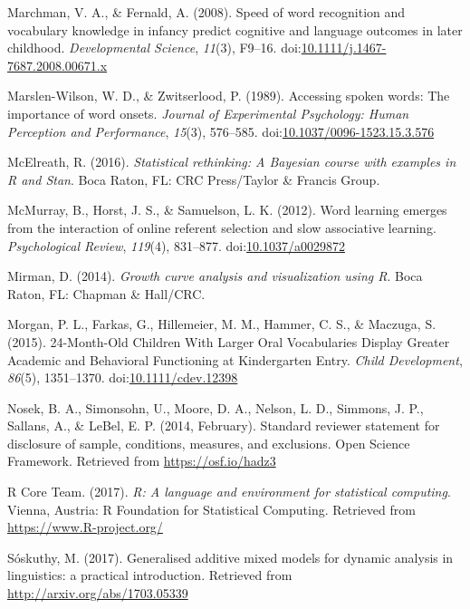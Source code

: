 \documentclass [11pt, proquest] {uwthesis}[2015/03/03]
\begin{document}
\hypertarget{ref-MarchmanFernald2008}{}
Marchman, V. A., \& Fernald, A. (2008). Speed of word recognition and
vocabulary knowledge in infancy predict cognitive and language outcomes
in later childhood. \emph{Developmental Science}, \emph{11}(3), F9--16.
doi:\href{https://doi.org/10.1111/j.1467-7687.2008.00671.x}{10.1111/j.1467-7687.2008.00671.x}

\hypertarget{ref-Marslen-Wilson1989}{}
Marslen-Wilson, W. D., \& Zwitserlood, P. (1989). Accessing spoken
words: The importance of word onsets. \emph{Journal of Experimental
Psychology: Human Perception and Performance}, \emph{15}(3), 576--585.
doi:\href{https://doi.org/10.1037/0096-1523.15.3.576}{10.1037/0096-1523.15.3.576}

\hypertarget{ref-RethinkingBook}{}
McElreath, R. (2016). \emph{Statistical rethinking: A Bayesian course
with examples in R and Stan}. Boca Raton, FL: CRC Press/Taylor \&
Francis Group.

\hypertarget{ref-McMurray2012}{}
McMurray, B., Horst, J. S., \& Samuelson, L. K. (2012). Word learning
emerges from the interaction of online referent selection and slow
associative learning. \emph{Psychological Review}, \emph{119}(4),
831--877. doi:\href{https://doi.org/10.1037/a0029872}{10.1037/a0029872}

\hypertarget{ref-Mirman2014}{}
Mirman, D. (2014). \emph{Growth curve analysis and visualization using
R}. Boca Raton, FL: Chapman \& Hall/CRC.

\hypertarget{ref-Morgan2015}{}
Morgan, P. L., Farkas, G., Hillemeier, M. M., Hammer, C. S., \& Maczuga,
S. (2015). 24-Month-Old Children With Larger Oral Vocabularies Display
Greater Academic and Behavioral Functioning at Kindergarten Entry.
\emph{Child Development}, \emph{86}(5), 1351--1370.
doi:\href{https://doi.org/10.1111/cdev.12398}{10.1111/cdev.12398}

\hypertarget{ref-OSF_Statement}{}
Nosek, B. A., Simonsohn, U., Moore, D. A., Nelson, L. D., Simmons, J.
P., Sallans, A., \& LeBel, E. P. (2014, February). Standard reviewer
statement for disclosure of sample, conditions, measures, and
exclusions. Open Science Framework. Retrieved from
\url{https://osf.io/hadz3}

\hypertarget{ref-R-base}{}
R Core Team. (2017). \emph{R: A language and environment for statistical
computing}. Vienna, Austria: R Foundation for Statistical Computing.
Retrieved from \url{https://www.R-project.org/}

\hypertarget{ref-Soskuthy2017}{}
Sóskuthy, M. (2017). Generalised additive mixed models for dynamic
analysis in linguistics: a practical introduction. Retrieved from
\url{http://arxiv.org/abs/1703.05339}
\end{document}
